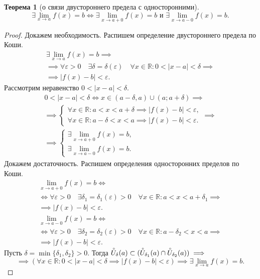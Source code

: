 \documentclass[a4paper,12pt]{article} %
\newtheorem{theorem}{Теорема}[section]
\theoremstyle{remark}
\theoremstyle{definition}
\begin{document}
\begin{theorem}[о связи двустороннего предела с односторонними]
	\[ \exists \lim_{x \to a} f(x) = b \iff \exists \lim_{x \to a+0} f(x) = b \text{ и } \exists \lim_{x \to a-0} f(x) = b .\]
\end{theorem}
\begin{proof}
	Докажем необходимость. Распишем определение двустороннего предела по Коши.
	\begin{multline}
		\exists  \lim_{x \to a} f(x) = b \implies \\
		\implies \forall \varepsilon>0 \quad \exists \delta=\delta(\varepsilon) \quad \forall x\in \mathbb{R} 
        : 0 < |x-a| < \delta \implies \\ \implies |f(x) - b| < \varepsilon.
	\end{multline}	
	Рассмотрим неравенство $0 < |x-a| < \delta$.
	\begin{multline}
		0 < |x-a| < \delta \iff x \in (a-\delta, a) \cup (a; a + \delta) \implies \\
		\implies \begin{cases}
			\forall x \in  \mathbb{R} : a < x < a+\delta \implies |f(x)-b|<\varepsilon, \\
			\forall x \in  \mathbb{R} : a-\delta < x < a \implies |f(x)-b|<\varepsilon.
		\end{cases} \implies \\
		\implies \begin{cases}
			\exists \lim_{x \to a+0} f(x) = b, \\
			\exists \lim_{x \to a-0} f(x) = b.
		\end{cases}
	\end{multline}
	Докажем достаточность. Распишем определения односторонних пределов по Коши.
	\begin{multline}
		\lim_{x \to a+0} f(x) = b \iff \\
		\iff \forall \varepsilon>0 \quad \exists \delta_1 = \delta_1(\varepsilon)>0 \quad \forall x\in \mathbb{R} : a < x < a+\delta_1 \implies \\
		\implies |f(x) - b| < \varepsilon.
	\end{multline}
	\begin{multline}
		\lim_{x \to a-0} f(x) = b \iff \\
		\iff \forall \varepsilon>0 \quad \exists \delta_2 = \delta_2(\varepsilon)>0 \quad \forall x\in \mathbb{R} : a -\delta_2 < x < a \implies \\
		\implies |f(x) - b| < \varepsilon.
	\end{multline}
	Пусть $\delta = \min \{\delta_1, \delta_2\} > 0$. Тогда $\accentset{\circ}{U}_\delta(a)\subset (\accentset{\circ}{U}_{\delta_1}(a)\cap \accentset{\circ}{U}_{\delta_2}(a)) \implies$
	\[
		\implies (\forall x\in \mathbb{R} : 0 < |x-a| < \delta \implies |f(x)-b| < \varepsilon) \implies \exists \lim_{x \to a} f(x) = b
	.\]
\end{proof}
\end{document}
